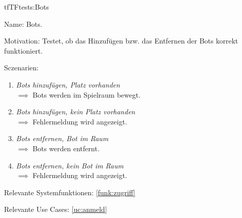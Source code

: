 \begin{description}[leftmargin=5em, style=sameline]

\begin{lhp}{tf}{TF}{tests:Bots }
	\item [Name:] Bots.
	\item [Motivation:] Testet, ob das Hinzufügen bzw. das Entfernen der Bots korrekt funktioniert.
	\item [Sczenarien:] \hfill
		\begin{enumerate}
			\item \textit{Bots hinzufügen, Platz vorhanden} \\ $\implies$ Bots werden im Spielraum bewegt.
			\item \textit{Bots hinzufügen, kein Platz vorhanden} \\ $\implies$ Fehlermeldung wird angezeigt.
			\item \textit{Bots entfernen, Bot im Raum} \\ $\implies$ Bots werden entfernt.
			\item \textit{Bots entfernen, kein Bot im Raum} \\ $\implies$ Fehlermeldung wird angezeigt.
		\end{enumerate}
	\item [Relevante Systemfunktionen:] \ref{funk:zugriff}
	\item [Relevante Use Cases:] \ref{uc:anmeld}
\end{lhp}

\end{description}

